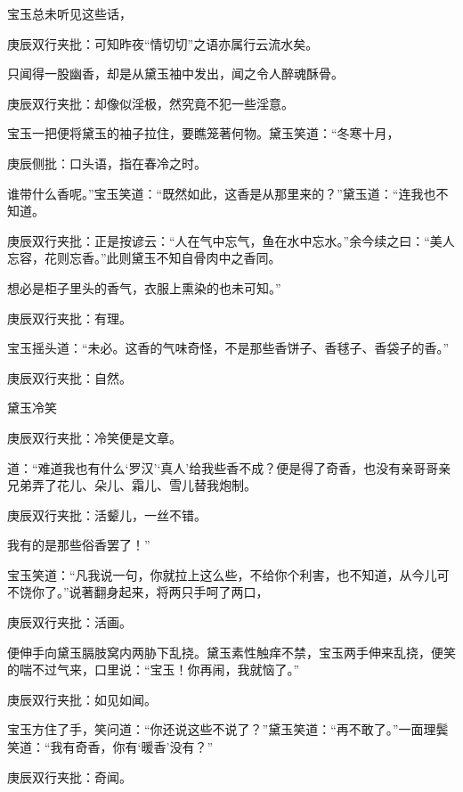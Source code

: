 \begin{parag}
    宝玉总未听见这些话，\begin{note}庚辰双行夹批：可知昨夜“情切切”之语亦属行云流水矣。\end{note}只闻得一股幽香，却是从黛玉袖中发出，闻之令人醉魂酥骨。\begin{note}庚辰双行夹批：却像似淫极，然究竟不犯一些淫意。\end{note}宝玉一把便将黛玉的袖子拉住，要瞧笼著何物。黛玉笑道：“冬寒十月，\begin{note}庚辰侧批：口头语，指在春冷之时。\end{note}谁带什么香呢。”宝玉笑道：“既然如此，这香是从那里来的？”黛玉道：“连我也不知道。\begin{note}庚辰双行夹批：正是按谚云：“人在气中忘气，鱼在水中忘水。”余今续之曰：“美人忘容，花则忘香。”此则黛玉不知自骨肉中之香同。\end{note}想必是柜子里头的香气，衣服上熏染的也未可知。”\begin{note}庚辰双行夹批：有理。\end{note}宝玉摇头道：“未必。这香的气味奇怪，不是那些香饼子、香毬子、香袋子的香。”\begin{note}庚辰双行夹批：自然。\end{note}黛玉冷笑\begin{note}庚辰双行夹批：冷笑便是文章。\end{note}道：“难道我也有什么‘罗汉’‘真人’给我些香不成？便是得了奇香，也没有亲哥哥亲兄弟弄了花儿、朵儿、霜儿、雪儿替我炮制。\begin{note}庚辰双行夹批：活颦儿，一丝不错。\end{note}我有的是那些俗香罢了！”
\end{parag}


\begin{parag}
    宝玉笑道：“凡我说一句，你就拉上这么些，不给你个利害，也不知道，从今儿可不饶你了。”说著翻身起来，将两只手呵了两口，\begin{note}庚辰双行夹批：活画。\end{note}便伸手向黛玉膈肢窝内两胁下乱挠。黛玉素性触痒不禁，宝玉两手伸来乱挠，便笑的喘不过气来，口里说：“宝玉！你再闹，我就恼了。”\begin{note}庚辰双行夹批：如见如闻。\end{note}宝玉方住了手，笑问道：“你还说这些不说了？”黛玉笑道：“再不敢了。”一面理鬓笑道：“我有奇香，你有‘暖香’没有？”\begin{note}庚辰双行夹批：奇闻。\end{note}
\end{parag}


